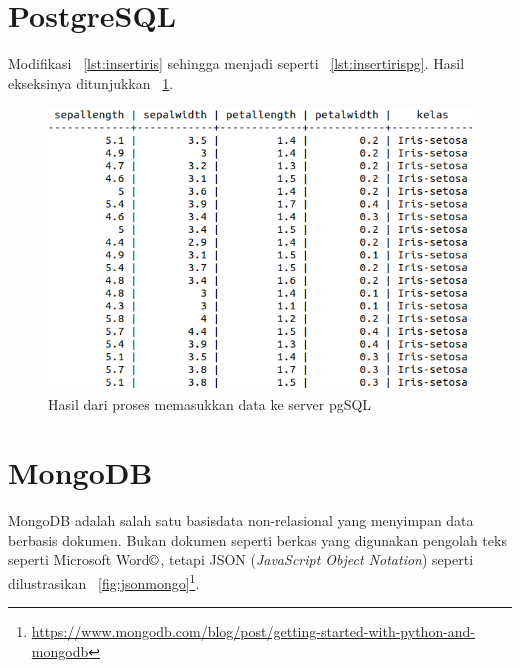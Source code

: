 \section{PostgreSQL}
Modifikasi \lstlistingname~\ref{lst:insertiris} sehingga menjadi seperti \lstlistingname~\ref{lst:insertirispg}. Hasil ekseksinya ditunjukkan \figurename~\ref{fig:insertpgsql}.



\begin{figure}
  \begin{center}
    \includegraphics[scale=2.0]{pics/insertpgsql.png}
    \caption{Hasil dari proses memasukkan data ke server pgSQL}
    \label{fig:insertpgsql}
  \end{center}
\end{figure}

\section{MongoDB}
MongoDB adalah salah satu basisdata non-relasional yang menyimpan data berbasis dokumen. Bukan dokumen seperti berkas yang digunakan pengolah teks seperti Microsoft Word$\copyright$, tetapi JSON (\textit{JavaScript Object Notation}) seperti dilustrasikan \figurename~\ref{fig:jsonmongo}\footnote{\url{https://www.mongodb.com/blog/post/getting-started-with-python-and-mongodb}}.

